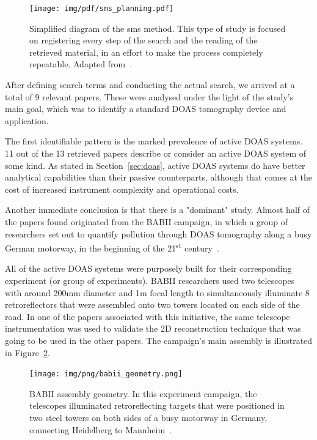 \begin{figure}[htpb]
    \centering
    \texttt{[image: img/pdf/sms\_planning.pdf]}
    \caption{Simplified diagram of the \gls{sms} method. This type of
    study is focused on registering every step of the search and the
    reading  of the retrieved material, in an effort to make the process
    completely repeatable. Adapted from~\cite{Kitchenham2007}.}
    \label{fig:sms_schematic}
\end{figure}

After defining search terms and conducting the actual search, we arrived
at a total of 9 relevant papers. These were analysed under the light of
the study's main goal, which was to identify a standard \gls{DOAS}
tomography device and application.

The first identifiable pattern is the marked prevalence of active
\gls{DOAS} systems. 11 out of the 13 retrieved papers describe or
consider an active \gls{DOAS} system of some kind. As stated in
Section~\ref{sec:doas}, active \gls{DOAS} systems do have better
analytical capabilities than their passive counterparts, although that
comes at the cost of increased instrument complexity and operational
costs. 

Another immediate conclusion is that there is a "dominant" study. Almost
half of the papers found originated from the BABII campaign, in which a
group of researchers set out to quantify pollution through \gls{DOAS}
tomography along a busy German motorway, in the beginning of the
21\textsuperscript{st} century~\cite{Hartl2005, Hartl2006,
Laepple2004, Pundt2005, Pundt2006, Pundt2005a, Mettendorf2005}.

All of the active \gls{DOAS} systems were purposely built for their
corresponding experiment (or group of experiments). BABII researchers
used two telescopes with around 200mm diameter and 1m focal length to
simultaneously illuminate 8 retroreflectors that were assembled onto two
towers located on each side of the road. In one of the papers associated
with this initiative, the same telescope instrumentation was used to
validate the 2D reconstruction technique that was going to be used in
the other papers. The campaign's main assembly is illustrated in
Figure~\ref{fig:babii}.

\begin{figure}[htpb]
    \centering
    \texttt{[image: img/png/babii\_geometry.png]}
    \caption{BABII assembly geometry. In this experiment campaign, the
    telescopes illuminated retroreflecting targets that were positioned
    in two steel towers on both sides of a busy motorway in Germany,
    connecting Heidelberg to Mannheim~\cite{Pundt2005a}.}
    \label{fig:babii}
\end{figure}


